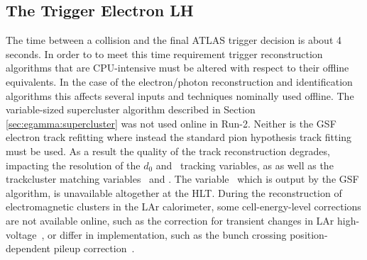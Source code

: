 \subsection{The Trigger Electron LH} \label{sec:egamma:trigger}
The time between a collision and the final ATLAS trigger decision is about 4 seconds.
In order to to meet this time requirement trigger reconstruction algorithms that are CPU-intensive must be altered with respect to their offline equivalents.
In the case of the electron/photon reconstruction and identification algorithms this affects several inputs and techniques nominally used offline.
The variable-sized supercluster algorithm described in Section \ref{sec:egamma:supercluster} was not used online in Run-2.
Neither is the GSF electron track refitting where instead the standard pion hypothesis track fitting must be used.
As a result the quality of the track reconstruction degrades, impacting the resolution of the $d_{0}$ and \dOSignificance\ tracking variables, as as well as the trackcluster matching variables \deltaphires\ and \deltaeta. %
The variable \deltapoverp\, which is output by the GSF algorithm, is unavailable altogether at the HLT.
During the reconstruction of electromagnetic clusters in the LAr calorimeter, some cell-energy-level corrections are not available online, such as the correction for transient changes in LAr high-voltage~\cite{LARG-2009-01}, or differ in implementation, such as the bunch crossing position-dependent pileup correction~\cite{ATL-DAQ-PUB-2017-001, PERF-2017-03, Aad:2019wsl}.


